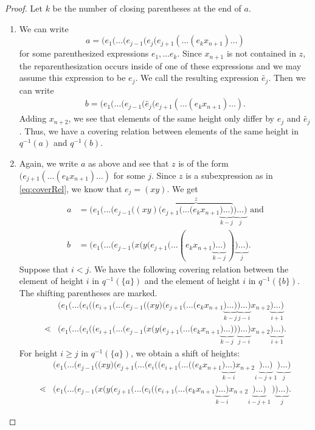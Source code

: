 \documentclass{preprint}
\theoremstyle{definition}
\begin{document}
\begin{proof}
    Let $k$ be the number of closing parentheses at the end of $a$.
    \begin{enumerate}
        \item We can write
        \[
            a = (e_1(\dots(e_{j-1}(e_j(e_{j+1}(\dots(e_kx_{n+1})\dots)
        \]
        for some parenthesized expressions $e_1,\dots e_k$. Since $x_{n+1}$ is not contained in $z$, the reparenthesization occurs inside of one of these expressions and we may assume this expression to be $e_j$. We call the resulting expression $\tilde{e_j}$. Then we can write
        \begin{align*}
        b = (e_1(\dots(e_{j-1}(\tilde{e_j}(e_{j+1}(\dots(e_kx_{n+1})\dots).
        \end{align*}
        Adding $x_{n+2}$, we see that elements of the same height only differ by $e_j$ and $\tilde{e_j}$. Thus, we have a covering relation between elements of the same height in $q^{-1}(a)$ and $q^{-1}(b)$.
        \item 
        Again, we write $a$ as above and see that $z$ is of the form $(e_{j+1}(\dots(e_kx_{n+1})\dots)$ for some $j$. Since $z$ is a subexpression as in \eqref{eq:coverRel}, we know that $e_j = (xy)$. We get
        \begin{align*}
            a &= (e_1(\dots(e_{j-1}((xy)\overbrace{(e_{j+1}(\dots(e_k x_{n+1}\underbrace{)\dots)}_{k-j}}^{z}\underbrace{)\dots)}_{j} \text{ and} \\
            b &= (e_1(\dots(e_{j-1}(x(y(e_{j+1}(\dots(e_k x_{n+1}\underbrace{)\dots)}_{k-j} \, ) \underbrace{)\dots)}_{j}.
        \end{align*}
        Suppose that $i < j$. We have the following covering relation between the element of height $i$ in $q^{-1}(\{a\})$ and the element of height $i$ in $q^{-1}(\{b\})$. The shifting parentheses are marked.
        \begin{align*}
            &(e_1(\dots(e_i((e_{i+1}(\dots(e_{j-1}(\pmb(xy\pmb)(e_{j+1}(\dots(e_k x_{n+1}\underbrace{)\dots)}_{k-j}\underbrace{)\dots)}_{j-i}x_{n+2}\underbrace{)\dots)}_{i+1} \\
            \lessdot &(e_1(\dots(e_i((e_{i+1}(\dots(e_{j-1}(x\pmb(y(e_{j+1}(\dots(e_k x_{n+1}\underbrace{)\dots)}_{k-j} \pmb) \underbrace{)\dots)}_{j-i}x_{n+2}\underbrace{)\dots)}_{i+1}.
        \end{align*}
        For height $i \geq j$ in $q^{-1}(\{a\})$, we obtain a shift of heights:
        \begin{align*}
            &(e_1(\dots(e_{j-1}(\pmb(xy\pmb)(e_{j+1}(\dots(e_i((e_{i+1}(\dots((e_k x_{n+1}\underbrace{)\dots)}_{k-i}x_{n+2}\underbrace{)\dots)}_{i-j+1}\underbrace{)\dots)}_{j} \\
            \lessdot &(e_1(\dots(e_{j-1}(x\pmb(y(e_{j+1}(\dots(e_i((e_{i+1}(\dots(e_k x_{n+1}\underbrace{)\dots)}_{k-i}x_{n+2}\underbrace{)\dots)}_{i-j+1}\,\pmb)\underbrace{)\dots)}_{j}.
        \end{align*}
    \end{enumerate}
\end{proof}
\end{document}
